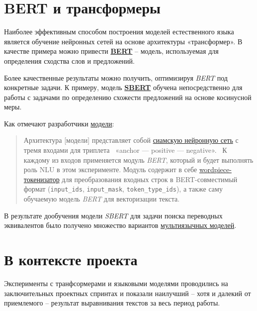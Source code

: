 \documentclass[
  letterpaper,
]{book}
\begin{document}
\hypertarget{sec-about_bert}{%
\section{BERT и трансформеры}\label{sec-about_bert}}

Наиболее эффективным способом построения моделей естественного языка
является обучение нейронных сетей на основе архитектуры «трансформер». В
качестве примера можно привести
\href{https://arxiv.org/abs/1810.04805}{\textbf{BERT}} -- модель,
используемая для определения сходства слов и предложений.

Более качественные результаты можно получить, оптимизируя \emph{BERT}
под конкретные задачи. К примеру, модель
\href{https://arxiv.org/pdf/1908.10084.pdf}{\textbf{SBERT}} обучена
непосредственно для работы с задачами по определению схожести
предложений на основе косинусной меры.

Как отмечают разработчики
\href{https://habr.com/ru/companies/sberdevices/articles/527576/}{модели}:

\begin{quote}
Архитектура {[}модели{]} представляет собой
\href{https://en.wikipedia.org/wiki/Siamese_neural_network}{сиамскую
нейронную сеть} с тремя входами для триплета~ «anchor --- positive ---
negative».~ К каждому из входов применяется модуль \emph{BERT}, который
и будет выполнять роль NLU в этом эксперименте. Модуль содержит в себе
\href{https://paperswithcode.com/method/wordpiece}{wordpiece-токенизатор}
для преобразования входных строк в BERT-совместимый формат
(\texttt{input\_ids}, \texttt{input\_mask}, \texttt{token\_type\_ids}),
а также саму обучаемую модель \emph{BERT} для векторизации текста.
\end{quote}

В результате дообучения модели \emph{SBERT} для задачи поиска переводных
эквивалентов было получено множество вариантов
\href{https://huggingface.co/models?pipeline_tag=sentence-similarity\&sort=downloads\&search=multi}{мультиязычных
моделей}.

\hypertarget{sec-project_transformers}{%
\section{В контексте проекта}\label{sec-project_transformers}}

Эксперименты с транфсормерами и языковыми моделями проводились на
заключительных проектных спринтах и показали наилучший -- хотя и далекий
от приемлемого -- результат выравнивания текстов за весь период работы.
\end{document}

